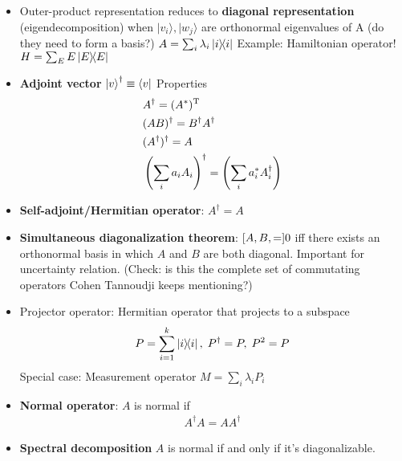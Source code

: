 \documentclass[11pt]{article}
\begin{document}
\begin{multicols}{3}
\begin{itemize}
        \item Outer-product representation reduces to \textbf{diagonal representation} (eigendecomposition) when $|v_i\rangle, |w_j\rangle$ are orthonormal eigenvalues of A (do they need to form a basis?)
              \subitem $A = \sum_i \lambda_i \dyad{i}$
              \subitem Example: Hamiltonian operator! $H=\sum_E E\dyad{E}$

        \item \textbf{Adjoint vector} $\ket{v}^\dagger \equiv \bra{v}$
              \subitem Properties
              \begin{align}
                   & A^\dagger = (A^*)^{\rm T}                                                   \\
                   & (AB)^\dagger = B^\dagger A^\dagger                                          \\
                   & (A^\dagger)^\dagger = A                                                     \\
                   & \left(\sum_i a_i A_i\right)^\dagger = \left(\sum_i a_i^* A_i^\dagger\right)
              \end{align}

        \item \textbf{Self-adjoint/Hermitian operator}: $A^\dagger=A$

        \item \textbf{Simultaneous diagonalization theorem}: $\comm{A,B}=0$ iff there exists an orthonormal basis in which $A$ and $B$ are both diagonal. Important for uncertainty relation. (Check: is this the complete set of commutating operators Cohen Tannoudji keeps mentioning?)
        \item Projector operator: Hermitian operator that projects to a subspace
              \begin{align}
                  P=\sum_{i=1}^k \dyad{i},\; P^\dagger=P,\; P^2 =P
              \end{align}
              \subitem Special case: Measurement operator $M=\sum_i\lambda_i P_i$


        \item \textbf{Normal operator}: $A$ is normal if
              \begin{align}
                  A^\dagger A = A A^\dagger
              \end{align}

        \item \textbf{Spectral decomposition} $A$ is normal if and only if it's diagonalizable.


\end{itemize}
\end{multicols}
\end{document}
